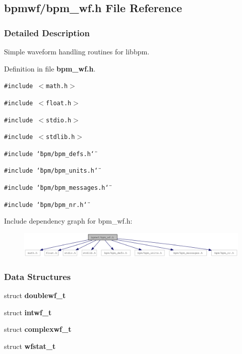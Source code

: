 \subsection{bpmwf/bpm\_\-wf.h File Reference}
\label{bpm__wf_8h}


\subsubsection{Detailed Description}
Simple waveform handling routines for libbpm. 



Definition in file {\bf bpm\_\-wf.h}.

{\tt \#include $<$math.h$>$}\par
{\tt \#include $<$float.h$>$}\par
{\tt \#include $<$stdio.h$>$}\par
{\tt \#include $<$stdlib.h$>$}\par
{\tt \#include \char`\"{}bpm/bpm\_\-defs.h\char`\"{}}\par
{\tt \#include \char`\"{}bpm/bpm\_\-units.h\char`\"{}}\par
{\tt \#include \char`\"{}bpm/bpm\_\-messages.h\char`\"{}}\par
{\tt \#include \char`\"{}bpm/bpm\_\-nr.h\char`\"{}}\par


Include dependency graph for bpm\_\-wf.h:\nopagebreak
\begin{figure}[H]
\begin{center}
\leavevmode
\includegraphics[width=414pt]{bpm__wf_8h__incl}
\end{center}
\end{figure}
\subsubsection*{Data Structures}
\begin{CompactItemize}
\item 
struct {\bf doublewf\_\-t}
\item 
struct {\bf intwf\_\-t}
\item 
struct {\bf complexwf\_\-t}
\item 
struct {\bf wfstat\_\-t}
\end{CompactItemize}
